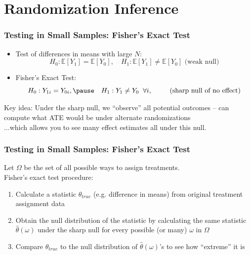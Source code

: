\documentclass[xcolor=dvipsnames]{beamer}
\newcommand\E{\mathbb{E}}
\begin{document}
\section{Randomization Inference}

\begin{frame}\frametitle{Testing in Small Samples: Fisher's Exact Test}
\begin{itemize}
\item Test of differences in means with large $N$:
\small
\[
H_0:\E[Y_1] =\E[Y_0],\quad H_1:\E[Y_1] \neq\E[Y_0]  \mbox{  (weak null)}
\]\pause
\normalsize
\item Fisher's Exact Test:
\small
\[
H_0: Y_{1i} = Y_{0i},\pause\quad H_1: Y_1 \neq Y_0\;\; \forall i,\;\;\qquad\mbox{(sharp null of no effect)}
\]\pause
\end{itemize}
\normalsize
\vspace{-.2in}
 \alert{Key idea}: Under the sharp null, we ``observe'' all potential outcomes -- can compute what ATE would be under alternate randomizations \\
\pause
\medskip
...which allows you to see many effect estimates all under this null.
\end{frame}


\begin{frame}\frametitle{Testing in Small Samples: Fisher's Exact Test}
\small
{} Let $\Omega$ be the set of all possible ways to assign treatments. \\
\bigskip
{} Fisher's exact test procedure:\\
\footnotesize
\begin{enumerate}
\item<3->  Calculate a statistic $\hat{\theta}_{true}$ (e.g. difference in means) from original treatment assignment data
\item<4->  Obtain the null distribution of the statistic by calculating the same statistic $\hat{\theta}(\omega)$ under the sharp null for every possible (or many) $\omega$ in $\Omega$
\item<5-> Compare $\hat{\theta}_{true}$ to the null distribution of $\hat{\theta}(\omega)$'s to see how ``extreme'' it is
\end{enumerate}
\end{frame}
\end{document}
